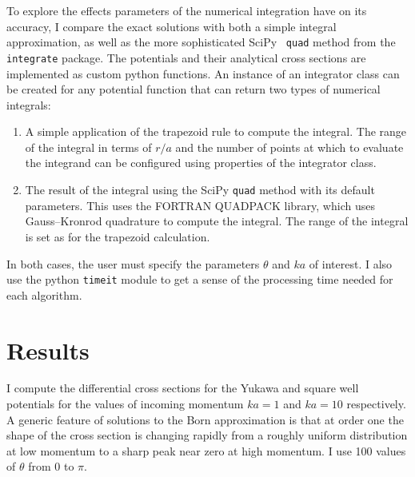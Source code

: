 \documentclass{project}
\begin{document}
To explore the effects parameters of the numerical integration have on its accuracy, I compare the exact solutions with both a simple integral approximation, as well as the more sophisticated SciPy~\cite{2020SciPy-NMeth} \texttt{quad} method from the \texttt{integrate} package. The potentials and their analytical cross sections are implemented as custom python functions. An instance of an integrator class can be created for any potential function that can return two types of numerical integrals:
\begin{enumerate}
\item A simple application of the trapezoid rule to compute the integral. The range of the integral in terms of $r/a$ and the number of points at which to evaluate the integrand can be configured using properties of the integrator class.
\item The result of the integral using the SciPy \texttt{quad} method with its default parameters. This uses the FORTRAN QUADPACK library, which uses Gauss–Kronrod quadrature to compute the integral. The range of the integral is set as for the trapezoid calculation.
\end{enumerate}
In both cases, the user must specify the parameters $\theta$ and $ka$ of interest. I also use the python \texttt{timeit} module to get a sense of the processing time needed for each algorithm.

\section{Results}

I compute the differential cross sections for the Yukawa and square well potentials for the values of incoming momentum $ka=1$ and $ka=10$ respectively. A generic feature of solutions to the Born approximation is that at order one the shape of the cross section is changing rapidly from a roughly uniform distribution at low momentum to a sharp peak near zero at high momentum. I use 100 values of $\theta$ from 0 to $\pi$.
\end{document}
